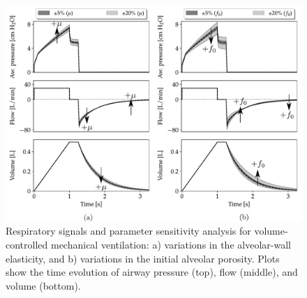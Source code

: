 \documentclass[preprint,3p,12pt,number,sort&compress]{elsarticle}
\begin{document}
\begin{figure}[h!]
    \begin{center}
    \includegraphics[width=1 \textwidth]{./Figures/SA_vcv.pdf}
    \caption[]{Respiratory signals and parameter sensitivity analysis for volume-controlled mechanical ventilation: a) variations in the alveolar-wall elasticity, and b) variations in the initial alveolar porosity.  Plots show the time evolution of airway pressure (top), flow (middle), and volume (bottom).}
    \label{fig:vcv-resp-mechanics}
    \end{center}
\end{figure}


\end{document}
